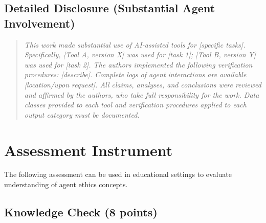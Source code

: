 \documentclass[11pt,letterpaper]{article}
\begin{document}
\subsection{Detailed Disclosure (Substantial Agent Involvement)}

\begin{quote}
\textit{This work made substantial use of AI-assisted tools for [specific tasks]. Specifically, [Tool A, version X] was used for [task 1]; [Tool B, version Y] was used for [task 2]. The authors implemented the following verification procedures: [describe]. Complete logs of agent interactions are available [location/upon request]. All claims, analyses, and conclusions were reviewed and affirmed by the authors, who take full responsibility for the work. Data classes provided to each tool and verification procedures applied to each output category must be documented.}
\end{quote}

\section{Assessment Instrument}
\label{app:assessment}

The following assessment can be used in educational settings to evaluate understanding of agent ethics concepts.

\subsection{Knowledge Check (8 points)}
\end{document}
